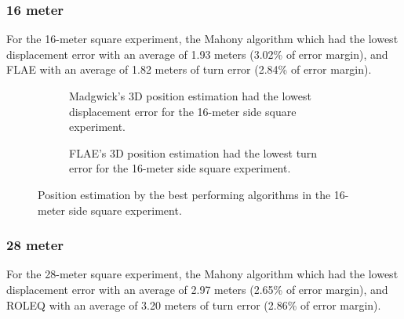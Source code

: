 \newpage

\subsubsection{16 meter}

For the 16-meter square experiment, the Mahony algorithm which had the lowest displacement error with an average of 1.93 meters (3.02\% of error margin), and FLAE with an average of 1.82 meters of turn error (2.84\% of error margin).

\vspace{-0.5cm}

\vspace{-1.5cm}

\begin{figure}[H]
    \centering
    \begin{subfigure}{0.49\textwidth}
        \centering
        \resizebox{1\linewidth}{!}{}
        \caption{Madgwick's 3D position estimation had the lowest displacement error for the 16-meter side square experiment.}
        \label{fig:square162D}
    \end{subfigure}
    \begin{subfigure}{0.49\textwidth}
        \centering
        \resizebox{1\linewidth}{!}{}
        \caption{FLAE's 3D position estimation had the lowest turn error for the 16-meter  side square experiment.}
        \label{fig:square163D}
    \end{subfigure}
    \caption{Position estimation by the best performing algorithms in the 16-meter side square experiment.}
    \label{fig:square16}
\end{figure}

\subsubsection{28 meter}

For the 28-meter square experiment, the Mahony algorithm which had the lowest displacement error with an average of 2.97 meters (2.65\% of error margin), and ROLEQ with an average of 3.20 meters of turn error (2.86\% of error margin).

\vspace{-0.5cm}

\vspace{-1.5cm}

